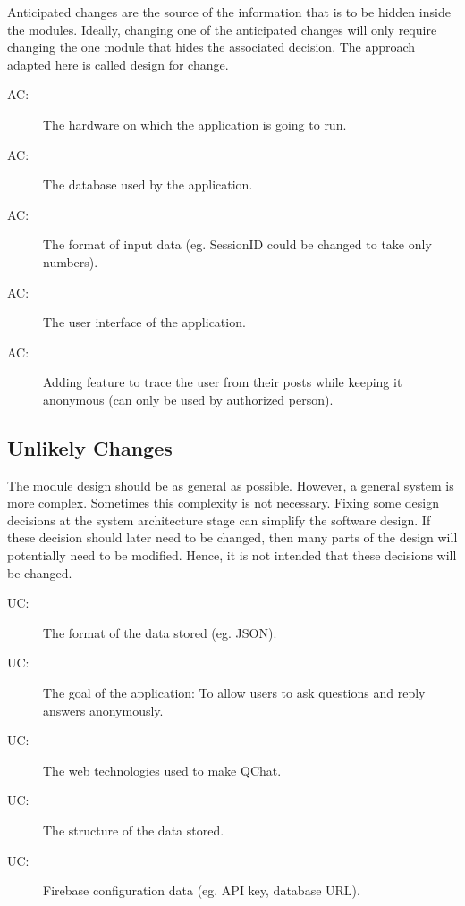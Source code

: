 \documentclass[12pt, titlepage]{article}
\newcounter{acnum}
\newcommand{\actheacnum}{AC\theacnum}
\newcounter{ucnum}
\newcommand{\uctheucnum}{UC\theucnum}
\begin{document}
Anticipated changes are the source of the information that is to be hidden
inside the modules. Ideally, changing one of the anticipated changes will only
require changing the one module that hides the associated decision. The approach
adapted here is called design for
change.

\begin{description}
\item[ \actheacnum \label{acHardware}:] The hardware on which the application is going to run.
\item[ \actheacnum \label{ac2}:] The database used by the application.
\item[ \actheacnum \label{ac3}:] The format of input data (eg. SessionID could be changed to take only numbers).
\item[ \actheacnum \label{ac4}:] The user interface of the application.
\item[ \actheacnum \label{ac5}:] Adding feature to trace the user from their posts while keeping it anonymous (can only be used by authorized person).
\end{description}

\subsection{Unlikely Changes} \label{SecUchange}

The module design should be as general as possible. However, a general system is
more complex. Sometimes this complexity is not necessary. Fixing some design
decisions at the system architecture stage can simplify the software design. If
these decision should later need to be changed, then many parts of the design
will potentially need to be modified. Hence, it is not intended that these
decisions will be changed.

\begin{description}
\item[ \uctheucnum \label{ucIO}:] The format of the data stored (eg. JSON).
\item[ \uctheucnum \label{ucInput}:] The goal of the application: To allow users to ask questions and reply answers anonymously.
\item[ \uctheucnum \label{ucInput}:] The web technologies used to make QChat.
\item[ \uctheucnum \label{ucInput}:] The structure of the data stored.
\item[ \uctheucnum \label{ucInput}:] Firebase configuration data (eg. API key, database URL).
\end{description}
\end{document}
